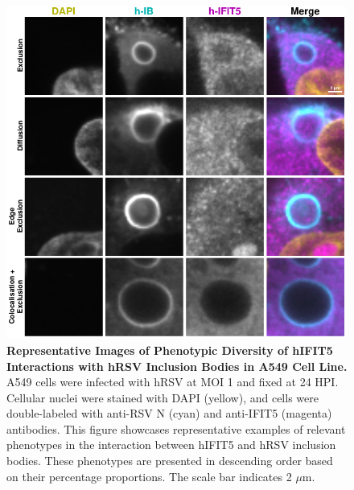 \begin{figure}
    \centering
    \includegraphics[width=1\linewidth]{08. Chapter 3/Figs/02. Infection/04. IFIT5/03. a549 i5.pdf}
    \caption[Representative Images of Phenotypic Diversity of hIFIT5 Interactions with hRSV Inclusion Bodies in A549 Cell Line.]{\textbf{Representative Images of Phenotypic Diversity of hIFIT5 Interactions with hRSV Inclusion Bodies in A549 Cell Line.} A549 cells were infected with hRSV at MOI 1 and fixed at 24 HPI. Cellular nuclei were stained with DAPI (yellow), and cells were double-labeled with anti-RSV N (cyan) and anti-IFIT5 (magenta) antibodies. This figure showcases representative examples of relevant phenotypes in the interaction between hIFIT5 and hRSV inclusion bodies. These phenotypes are presented in descending order based on their percentage proportions. The scale bar indicates 2 \(\mu \mbox{m}\).}
    \label{fig:Representative Images of Phenotypic Diversity of hIFIT5 Interactions with hRSV Inclusion Bodies in A549 Cell Line}
\end{figure}

